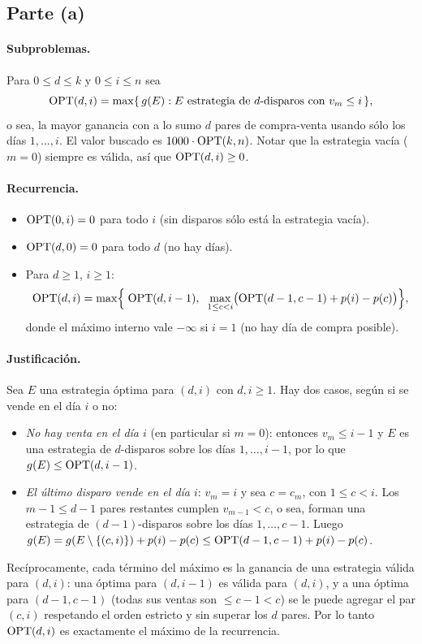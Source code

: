 \subsection*{Parte (a)}

\paragraph{Subproblemas.} Para $0\le d\le k$ y $0\le i\le n$ sea
\[
\mathrm{OPT}(d,i) = \max\{\, g(E) : E \text{ estrategia de } d\text{-disparos con } v_m\le i\,\},
\]
o sea, la mayor ganancia con a lo sumo $d$ pares de compra-venta usando sólo los días $1,\dots,i$. El valor
buscado es $1000\cdot\mathrm{OPT}(k,n)$. Notar que la estrategia vacía ($m=0$) siempre es válida, así que
$\mathrm{OPT}(d,i)\ge 0$.

\paragraph{Recurrencia.}
\begin{itemize}
\item $\mathrm{OPT}(0,i)=0$ para todo $i$ (sin disparos sólo está la estrategia vacía).
\item $\mathrm{OPT}(d,0)=0$ para todo $d$ (no hay días).
\item Para $d\ge1$, $i\ge1$:
\[
\mathrm{OPT}(d,i) = \max\Bigl\{\; \mathrm{OPT}(d,i-1),\;\; \max_{1\le c<i}\bigl(\mathrm{OPT}(d-1,c-1) + p(i)-p(c)\bigr) \Bigr\},
\]
donde el máximo interno vale $-\infty$ si $i=1$ (no hay día de compra posible).
\end{itemize}

\paragraph{Justificación.} Sea $E$ una estrategia óptima para $(d,i)$ con $d,i\ge 1$. Hay dos casos,
según si se vende en el día $i$ o no:
\begin{itemize}
\item \emph{No hay venta en el día $i$} (en particular si $m=0$): entonces $v_m\le i-1$ y $E$ es una
  estrategia de $d$-disparos sobre los días $1,\dots,i-1$, por lo que $g(E)\le \mathrm{OPT}(d,i-1)$.
\item \emph{El último disparo vende en el día $i$}: $v_m=i$ y sea $c=c_m$, con $1\le c<i$. Los $m-1\le d-1$
  pares restantes cumplen $v_{m-1}<c$, o sea, forman una estrategia de $(d-1)$-disparos sobre los días
  $1,\dots,c-1$. Luego $g(E) = g(E\setminus\{(c,i)\}) + p(i)-p(c) \le \mathrm{OPT}(d-1,c-1)+p(i)-p(c)$.
\end{itemize}
Recíprocamente, cada término del máximo es la ganancia de una estrategia válida para $(d,i)$: una óptima
para $(d,i-1)$ es válida para $(d,i)$, y a una óptima para $(d-1,c-1)$ (todas sus ventas son $\le c-1<c$) se le
puede agregar el par $(c,i)$ respetando el orden estricto y sin superar los $d$ pares. Por lo tanto
$\mathrm{OPT}(d,i)$ es exactamente el máximo de la recurrencia.

